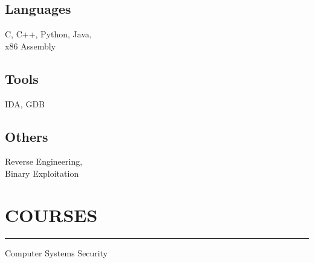 \documentclass[]{jobCV}
\begin{document}
\begin{minipage}[t]{0.33\textwidth}
    \vspace{6pt}
    \subsection{Languages}
    \noindent C, C++, Python, Java,\\
    x86 Assembly

    \vspace{6pt}
    \subsection{Tools}
    \noindent IDA, GDB

    \vspace{6pt}
    \subsection{Others}
    \noindent Reverse Engineering,\\
    Binary Exploitation


    \section{COURSES}
    \noindent\rule{5cm}{0.4pt}

    \noindent Computer Systems Security\\
    \noindent {}\\

\end{minipage}

%
%
\end{document}
